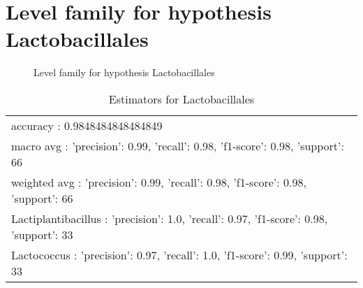 \documentclass[12pt]{article}
\begin{document}
\clearpage
\pagebreak[4]
\section*{Level family for hypothesis Lactobacillales}
\begin{figure}[h]
\centering


\caption{Level family for hypothesis Lactobacillales}
\label{f-Level family for hypothesis Lactobacillales}
\end{figure}
\begin{table}[htp]
\begin{tabular}{l}
accuracy : 0.9848484848484849 \\
macro avg : {'precision': 0.99, 'recall': 0.98, 'f1-score': 0.98, 'support': 66} \\
weighted avg : {'precision': 0.99, 'recall': 0.98, 'f1-score': 0.98, 'support': 66} \\
Lactiplantibacillus : {'precision': 1.0, 'recall': 0.97, 'f1-score': 0.98, 'support': 33} \\
Lactococcus : {'precision': 0.97, 'recall': 1.0, 'f1-score': 0.99, 'support': 33}
\end{tabular}
\caption*{Estimators for Lactobacillales}
\end{table}
\end{document}

